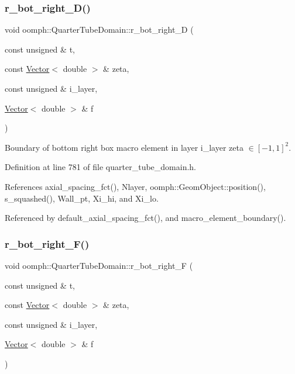 \subsubsection{\texorpdfstring{r\+\_\+bot\+\_\+right\+\_\+\+D()}{r\_bot\_right\_D()}}
{\footnotesize\ttfamily void oomph\+::\+Quarter\+Tube\+Domain\+::r\+\_\+bot\+\_\+right\+\_\+D (\begin{DoxyParamCaption}\item[{const unsigned \&}]{t,  }\item[{const \hyperlink{classoomph_1_1Vector}{Vector}$<$ double $>$ \&}]{zeta,  }\item[{const unsigned \&}]{i\+\_\+layer,  }\item[{\hyperlink{classoomph_1_1Vector}{Vector}$<$ double $>$ \&}]{f }\end{DoxyParamCaption})\hspace{0.3cm}{\ttfamily [private]}}



Boundary of bottom right box macro element in layer i\+\_\+layer zeta $ \in [-1,1]^2 $. 



Definition at line 781 of file quarter\+\_\+tube\+\_\+domain.\+h.



References axial\+\_\+spacing\+\_\+fct(), Nlayer, oomph\+::\+Geom\+Object\+::position(), s\+\_\+squashed(), Wall\+\_\+pt, Xi\+\_\+hi, and Xi\+\_\+lo.



Referenced by default\+\_\+axial\+\_\+spacing\+\_\+fct(), and macro\+\_\+element\+\_\+boundary().

\mbox{\label{classoomph_1_1QuarterTubeDomain_a7d71f1ff7b0ea3a9bdbf68b6248a60fe}} 
\subsubsection{\texorpdfstring{r\+\_\+bot\+\_\+right\+\_\+\+F()}{r\_bot\_right\_F()}}
{\footnotesize\ttfamily void oomph\+::\+Quarter\+Tube\+Domain\+::r\+\_\+bot\+\_\+right\+\_\+F (\begin{DoxyParamCaption}\item[{const unsigned \&}]{t,  }\item[{const \hyperlink{classoomph_1_1Vector}{Vector}$<$ double $>$ \&}]{zeta,  }\item[{const unsigned \&}]{i\+\_\+layer,  }\item[{\hyperlink{classoomph_1_1Vector}{Vector}$<$ double $>$ \&}]{f }\end{DoxyParamCaption})\hspace{0.3cm}{\ttfamily [private]}}



